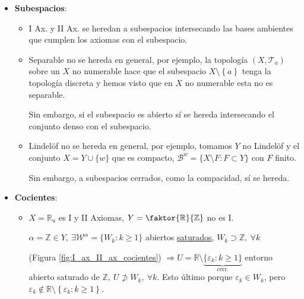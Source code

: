 \begin{demo}
\begin{itemize}
    \item \textbf{Subespacios}:
    \begin{itemize}
        \item I Ax. y II Ax. se heredan a subespacios intersecando las bases ambientes que cumplen los axiomas con el subespacio.
        \item Separable no se hereda en general, por ejemplo, la topología $\left( X, \mathcal{T}_a \right)$ sobre un $X$ no numerable hace que el subespacio $X\setminus \left\{ a \right\}$ tenga la topología discreta y hemos visto que en $X$ no numerable esta no es separable.
        
        Sin embargo, si el subespacio es abierto sí se hereda intersecando el conjunto denso con el subespacio.

        
        \item Lindelöf no se hereda en general, por ejemplo, tomamos $Y$ no Lindelöf y el conjunto $X = Y \cup \{w\}$ que es compacto, $\mathcal{B}^w = \{X \setminus F: F \subset Y\}$ con $F$ finito.   
        
         Sin embargo, a subespacios cerrados, como la compacidad, sí se hereda.         
    \end{itemize}

    \item \textbf{Cocientes}:
    \begin{itemize}
        \item $X = \mathbb{R}_u$ es I y II Axiomas, $Y = \faktor{\mathbb{R}}{\mathbb{Z}}$ no es I.
        \begin{demo}
            $\alpha = \mathbb{Z} \in Y,\ \exists \mathcal{W}^{\alpha} = \{W_k : k \ge 1\}$ abiertos \underline{saturados}, $W_k \supset \mathbb{Z},\ \forall k$

            (Figura \ref{fig:I_ax_II_ax_cocientes}) $\Rightarrow U = \mathbb{R} \setminus \underbrace{\{\varepsilon_k : k \ge 1\}}_{\text{cerr.}}$ entorno abierto saturado de $\mathbb{Z},\ U \not \supset W_k,\ \forall k$. Esto último porque $\varepsilon_k \in W_k$, pero $\varepsilon_k \not\in \mathbb{R} \setminus \left\{ \varepsilon_k : k \ge 1 \right\}$.


\end{demo}
\end{itemize}
\end{itemize}
\end{demo}
